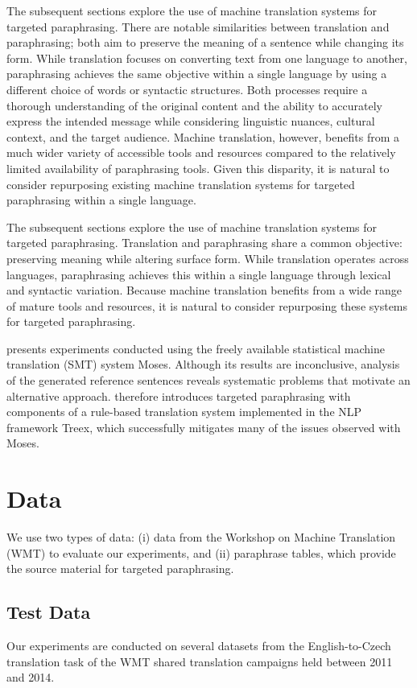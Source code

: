The subsequent sections explore the use of machine translation systems for targeted paraphrasing. There are notable similarities between translation and paraphrasing; both aim to preserve the meaning of a sentence while changing its form. While translation focuses on converting text from one language to another, paraphrasing achieves the same objective within a single language by using a different choice of words or syntactic structures. Both processes require a thorough understanding of the original content and the ability to accurately express the intended message while considering linguistic nuances, cultural context, and the target audience. Machine translation, however, benefits from a much wider variety of accessible tools and resources compared to the relatively limited availability of paraphrasing tools. Given this disparity, it is natural to consider repurposing existing machine translation systems for targeted paraphrasing within a single language.

The subsequent sections explore the use of machine translation systems for targeted paraphrasing. Translation and paraphrasing share a common objective: preserving meaning while altering surface form. While translation operates across languages, paraphrasing achieves this within a single language through lexical and syntactic variation. Because machine translation benefits from a wide range of mature tools and resources, it is natural to consider repurposing these systems for targeted paraphrasing.

 presents experiments conducted using the freely available statistical machine translation (SMT) system Moses. Although its results are inconclusive, analysis of the generated reference sentences reveals systematic problems that motivate an alternative approach.  therefore introduces targeted paraphrasing with components of a rule-based translation system implemented in the NLP framework Treex, which successfully mitigates many of the issues observed with Moses.

\section{Data}
\label{prehistory:data}
We use two types of data: (i) data from the Workshop on Machine Translation (WMT) to evaluate our experiments, and (ii) paraphrase tables, which provide the source material for targeted paraphrasing.

\subsection{Test Data}
Our experiments are conducted on several datasets from the English-to-Czech translation task of the WMT shared translation campaigns held between 2011 and 2014.

